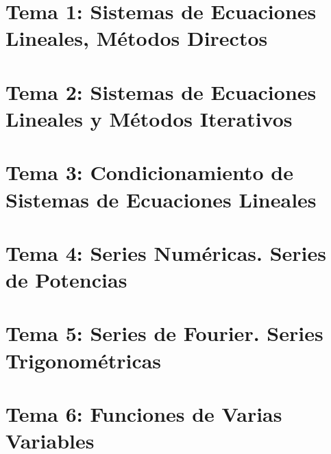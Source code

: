 \renewcommand{\contentsname}{Indice}
\tableofcontents
\newpage
\section{Tema 1: Sistemas de Ecuaciones Lineales, Métodos Directos}

\newpage
\section{Tema 2: Sistemas de Ecuaciones Lineales y Métodos Iterativos}

\newpage
\section{Tema 3: Condicionamiento de Sistemas de Ecuaciones Lineales}

\newpage
\section{Tema 4: Series Numéricas. Series de Potencias}

\newpage
\section{Tema 5: Series de Fourier. Series Trigonométricas}

\newpage
\section{Tema 6: Funciones de Varias Variables}
